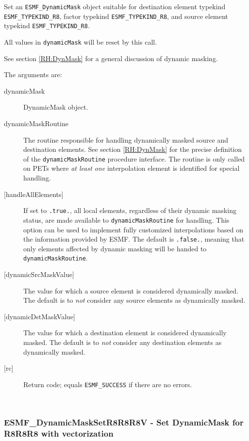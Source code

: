      \label{api:DynamicMaskSetR8R8R8}
     Set an {\tt ESMF\_DynamicMask} object suitable for 
     destination element typekind {\tt ESMF\_TYPEKIND\_R8},
     factor typekind {\tt ESMF\_TYPEKIND\_R8}, and
     source element typekind {\tt ESMF\_TYPEKIND\_R8}.
     
     All values in {\tt dynamicMask} will be reset by this call.
  
     See section \ref{RH:DynMask} for a general discussion of dynamic masking.
  
     The arguments are:
     \begin{description}
     \item[dynamicMask] 
       DynamicMask object.
     \item [dynamicMaskRoutine]
       The routine responsible for handling dynamically masked source and 
       destination elements. See section \ref{RH:DynMask} for the precise
       definition of the {\tt dynamicMaskRoutine} procedure interface.
       The routine is only called on PETs where {\em at least one} interpolation 
       element is identified for special handling.
     \item [{[handleAllElements]}]
       If set to {\tt .true.}, all local elements, regardless of their dynamic
       masking status, are made available to {\tt dynamicMaskRoutine} for
       handling. This option can be used to implement fully customized
       interpolations based on the information provided by ESMF.
       The default is {\tt .false.}, meaning that only elements affected by
       dynamic masking will be handed to {\tt dynamicMaskRoutine}.
     \item [{[dynamicSrcMaskValue]}]
       The value for which a source element is considered dynamically
       masked.
       The default is to {\em not} consider any source elements as
       dynamically masked.
     \item [{[dynamicDstMaskValue]}]
       The value for which a destination element is considered dynamically
       masked.
       The default is to {\em not} consider any destination elements as
       dynamically masked.
     \item[{[rc]}] 
       Return code; equals {\tt ESMF\_SUCCESS} if there are no errors.
     \end{description}
   
 
\mbox{}\hrulefill\ 
 
\subsubsection [ESMF\_DynamicMaskSetR8R8R8V] {ESMF\_DynamicMaskSetR8R8R8V - Set DynamicMask for R8R8R8 with vectorization}


